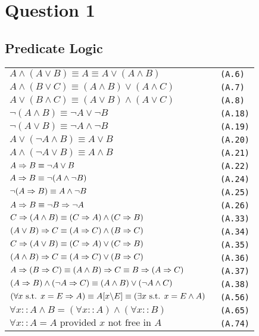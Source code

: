 \section{Question 1}

\subsection{Predicate Logic}

\begin{tabular}{@{}ll@{}}
$ A \land (A \lor B) \equiv A \equiv A \lor (A \land B)$ & \verb! (A.6)! \\
$ A \land (B \lor C) \equiv (A \land B) \lor (A \land C)$ & \verb! (A.7)! \\
$ A \lor (B \land C) \equiv (A \lor B) \land (A \lor C)$ & \verb! (A.8)! \\
$ \neg (A \land B) \equiv \neg A \lor \neg B$ & \verb! (A.18)! \\
$ \neg (A \lor B) \equiv \neg A \land \neg B$ & \verb! (A.19)! \\
$ A \lor (\neg A \land B) \equiv A \lor B$ & \verb! (A.20)! \\
$ A \land (\neg A \lor B) \equiv A \land B$ & \verb! (A.21)! \\
$ A \Rightarrow B \equiv \neg A \lor B$ & \verb! (A.22)! \\
$ A \Rightarrow B \equiv \neg(A \land \neg B)$ & \verb! (A.24)! \\
$ \neg(A \Rightarrow B) \equiv A \land \neg B$ & \verb! (A.25)! \\
$ A \Rightarrow B \equiv \neg B \Rightarrow \neg A$ & \verb! (A.26)! \\
$ C \Rightarrow (A \land B) \equiv (C \Rightarrow A) \land (C \Rightarrow B)$ & \verb! (A.33)! \\
$ (A \lor B) \Rightarrow C \equiv (A \Rightarrow C) \land (B \Rightarrow C)$ & \verb! (A.34)! \\
$ C \Rightarrow (A \lor B) \equiv (C \Rightarrow A) \lor (C \Rightarrow B)$ & \verb! (A.35)! \\
$ (A \land B) \Rightarrow C \equiv (A \Rightarrow C) \lor (B \Rightarrow C)$ & \verb! (A.36)! \\
$ A \Rightarrow (B \Rightarrow C) \equiv (A \land B) \Rightarrow C \equiv B \Rightarrow (A \Rightarrow C)$ & \verb! (A.37)! \\
$ (A \Rightarrow B) \land (\neg A \Rightarrow C) \equiv (A \land B) \lor (\neg A \land C)$ & \verb! (A.38)! \\
$ (\forall x \text{ s.t. } x = E \Rightarrow A) \equiv A[x \backslash E] \equiv (\exists x \text{ s.t. } x = E \land A)$ & \verb! (A.56)! \\
$ \forall x :: A \land B = (\forall x :: A) \land (\forall x :: B)$ & \verb! (A.65)! \\
$ \forall x :: A = A \text{ provided } x \text{ not free in } A$ & \verb! (A.74)! \\
\end{tabular}

